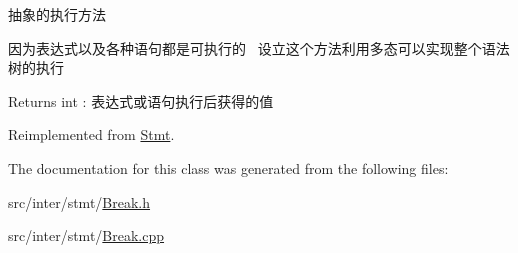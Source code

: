 抽象的执行方法 

因为表达式以及各种语句都是可执行的~\newline
设立这个方法利用多态可以实现整个语法树的执行~\newline
 \begin{DoxyReturn}{Returns}
int \+: 表达式或语句执行后获得的值 
\end{DoxyReturn}


Reimplemented from \hyperlink{class_stmt_abdc3261770c3c5bd3ce5b3ba6eedfaa4}{Stmt}.



The documentation for this class was generated from the following files\+:\begin{DoxyCompactItemize}
\item 
src/inter/stmt/\hyperlink{_break_8h}{Break.\+h}\item 
src/inter/stmt/\hyperlink{_break_8cpp}{Break.\+cpp}\end{DoxyCompactItemize}
